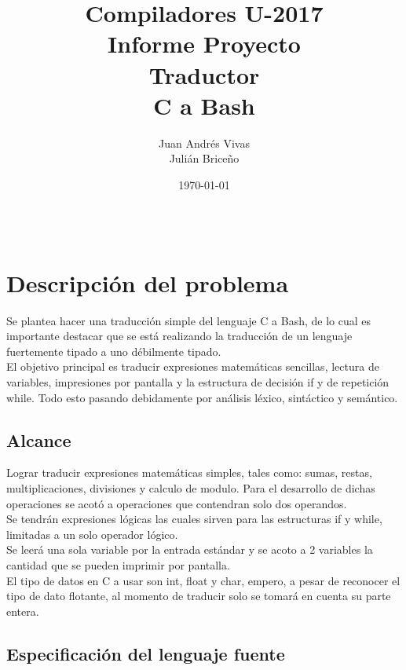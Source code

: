 \documentclass[aspectratio=169]{article}
\title{Compiladores U-2017 \\ Informe Proyecto \\ Traductor \\ C a Bash} %
\author{Juan Andr\'es Vivas\\
		Juli\'an Brice\~no} %
\date{\today} %
\begin{document}
\maketitle %

\begin{center}
\begin{tabular}{l r}

\end{tabular}
\end{center}

\newpage

\section{Descripci\'on del problema}

	Se plantea hacer una traducci\'on simple del lenguaje C a Bash, de lo cual es importante destacar que se est\'a
	realizando la traducci\'on de un lenguaje fuertemente tipado a uno débilmente tipado.\\

	El objetivo principal es traducir expresiones matem\'aticas sencillas, lectura de variables, impresiones por
	pantalla y la estructura de decisión if y de repetición while. Todo esto pasando debidamente por an\'alisis 
	l\'exico, sint\'actico y sem\'antico.

\subsection{Alcance}

	Lograr traducir expresiones matem\'aticas simples, tales como: sumas, restas, multiplicaciones,
	divisiones y calculo de modulo. Para el desarrollo de dichas operaciones se acot\'o a operaciones que 
	contendran solo dos operandos. \\

	Se tendrán expresiones l\'ogicas las cuales sirven para las estructuras if y while, limitadas a un
	solo operador l\'ogico.\\

	Se leerá una sola variable por la entrada estándar y se acoto a 2 variables la cantidad que se pueden
	imprimir por pantalla.\\

	El tipo de datos en C a usar son int, float y char, empero, a pesar de reconocer el tipo de dato flotante,
	al momento de traducir solo se tomar\'a en cuenta su parte entera.

\subsection{Especificaci\'on del lenguaje fuente}
\end{document}
